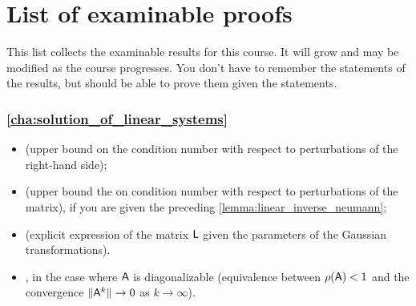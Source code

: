 \chapter*{List of examinable proofs}%
This list collects the examinable results for this course.
It will grow and may be modified as the course progresses.
You don't have to remember the statements of the results,
but should be able to prove them given the statements.

\subsection*{\cref{cha:solution_of_linear_systems}}%

\begin{itemize}
    \item {} (upper bound on the condition number with respect to perturbations of the right-hand side);
    \item {} (upper bound the on condition number with respect to perturbations of the matrix),
        if you are given the preceding \cref{lemma:linear_inverse_neumann};
    \item {} (explicit expression of the matrix $\mathsf L$ given the parameters of the Gaussian transformations).
    \item {},
        in the case where $\mathsf A$ is diagonalizable (equivalence between $\rho(\mathsf A) < 1$ and the convergence $\lVert\mathsf A^k\rVert \to 0$ as $k \to \infty$).
\end{itemize}
